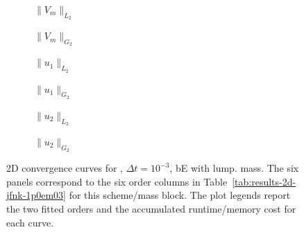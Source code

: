 \begin{figure}[p]
\centering
\begin{subfigure}{0.485\linewidth}
\centering
{}
\caption{$\|V_m\|_{L_2}$}
\label{fig:results-2d-jfnk-1p0em03-backwardeuler-lumped-a}
\end{subfigure}
\hfill
\begin{subfigure}{0.485\linewidth}
\centering
{}
\caption{$\|V_m\|_{G_2}$}
\label{fig:results-2d-jfnk-1p0em03-backwardeuler-lumped-b}
\end{subfigure}
\par\vspace{0.8em}
\begin{subfigure}{0.485\linewidth}
\centering
{}
\caption{$\|u_1\|_{L_2}$}
\label{fig:results-2d-jfnk-1p0em03-backwardeuler-lumped-c}
\end{subfigure}
\hfill
\begin{subfigure}{0.485\linewidth}
\centering
{}
\caption{$\|u_1\|_{G_2}$}
\label{fig:results-2d-jfnk-1p0em03-backwardeuler-lumped-d}
\end{subfigure}
\par\vspace{0.8em}
\begin{subfigure}{0.485\linewidth}
\centering
{}
\caption{$\|u_2\|_{L_2}$}
\label{fig:results-2d-jfnk-1p0em03-backwardeuler-lumped-e}
\end{subfigure}
\hfill
\begin{subfigure}{0.485\linewidth}
\centering
{}
\caption{$\|u_2\|_{G_2}$}
\label{fig:results-2d-jfnk-1p0em03-backwardeuler-lumped-f}
\end{subfigure}
\caption{2D convergence curves for , $\Delta t=10^{-3}$, bE with lump. mass. The six panels correspond to the six order columns in Table~\ref{tab:results-2d-jfnk-1p0em03} for this scheme/mass block. The plot legends report the two fitted orders and the accumulated runtime/memory cost for each curve.}
\label{fig:results-2d-jfnk-1p0em03-backwardeuler-lumped}
\end{figure}
\FloatBarrier

